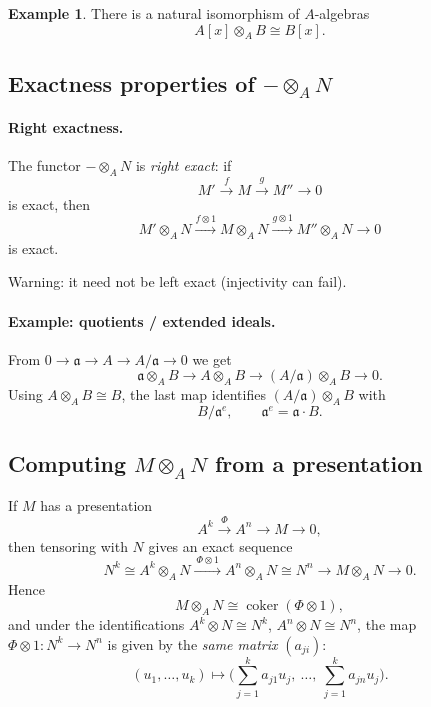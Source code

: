 \documentclass[11pt,a4paper]{article}
\theoremstyle{definition}
\newtheorem{example}[definition]{Example}
\theoremstyle{plain}
\theoremstyle{remark}
\newcommand{\coker}{\operatorname{coker}}
\begin{document}
\begin{example}
There is a natural isomorphism of $A$-algebras
\[
A[x]\otimes_A B \cong B[x].
\]
\end{example}


\subsection{Exactness properties of \texorpdfstring{$-\otimes_A N$}{- tensor N}}

\paragraph{Right exactness.}
The functor $-\otimes_A N$ is \emph{right exact}: if
\[
M' \xrightarrow{f} M \xrightarrow{g} M'' \to 0
\]
is exact, then
\[
M'\otimes_A N \xrightarrow{f\otimes 1} M\otimes_A N \xrightarrow{g\otimes 1} M''\otimes_A N \to 0
\]
is exact.

Warning: it need not be left exact (injectivity can fail).

\paragraph{Example: quotients / extended ideals.}
From $0\to \mathfrak a \to A \to A/\mathfrak a \to 0$ we get
\[
\mathfrak a\otimes_A B \to A\otimes_A B \to (A/\mathfrak a)\otimes_A B \to 0.
\]
Using $A\otimes_A B\cong B$, the last map identifies $(A/\mathfrak a)\otimes_A B$ with
\[
B/\mathfrak a^e,\qquad \mathfrak a^e=\mathfrak a\cdot B.
\]

\subsection*{Computing \texorpdfstring{$M\otimes_A N$}{M tensor N} from a presentation}

If $M$ has a presentation
\[
A^k \xrightarrow{\ \Phi\ } A^n \to M \to 0,
\]
then tensoring with $N$ gives an exact sequence
\[
N^k \cong A^k\otimes_A N \xrightarrow{\ \Phi\otimes 1\ } A^n\otimes_A N \cong N^n \to M\otimes_A N \to 0.
\]
Hence
\[
M\otimes_A N \cong \coker(\Phi\otimes 1),
\]
and under the identifications $A^k\otimes N\cong N^k$, $A^n\otimes N\cong N^n$, the map
$\Phi\otimes 1: N^k\to N^n$ is given by the \emph{same matrix} $(a_{ji})$:
\[
(u_1,\dots,u_k)\longmapsto \Big(\sum_{j=1}^k a_{j1}u_j,\ \dots,\ \sum_{j=1}^k a_{jn}u_j\Big).
\]
\end{document}
